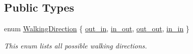 \subsection*{Public Types}
\begin{DoxyCompactItemize}
\item 
enum \mbox{\hyperlink{structdto_1_1_track_a2d90d1ffc1df80623114c42f874aad04}{Walking\+Direction}} \{ \mbox{\hyperlink{structdto_1_1_track_a2d90d1ffc1df80623114c42f874aad04a0656e7a4e2814cc36d4b434e1b4ca16b}{out\+\_\+in}}, 
\mbox{\hyperlink{structdto_1_1_track_a2d90d1ffc1df80623114c42f874aad04a3e83d06d75cc52f383eed0ba79b12d49}{in\+\_\+out}}, 
\mbox{\hyperlink{structdto_1_1_track_a2d90d1ffc1df80623114c42f874aad04aeb964a5585a9babc2b96baee0abe9064}{out\+\_\+out}}, 
\mbox{\hyperlink{structdto_1_1_track_a2d90d1ffc1df80623114c42f874aad04a67402e9285253d6a2bcae77df34b6b7d}{in\+\_\+in}}
 \}
\begin{DoxyCompactList}\small\item\em This enum lists all possible walking directions. \end{DoxyCompactList}\end{DoxyCompactItemize}
